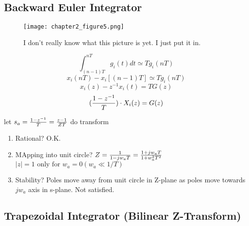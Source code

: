 \documentclass[11pt,fleqn]{book} %
\begin{document}
\subsection{Backward Euler Integrator}

\begin{figure}[h]
  \centering\texttt{[image: chapter2\_figure5.png]}
  \caption{I don't really know what this picture is yet. I just put it in.}
\end{figure}

$$\int_{(n-1)T}^{nT}g_i(t)dt\simeq Tg_i(nT)$$
$$x_i(nT)-x_i[(n-1)T]\simeq Tg_i(nT)$$
$$x_i(z)-z^{-1}x_i(t)=TG(z)$$
$$({1-z^{-1}\over T})\cdot X_i(z)=G(z)$$
\begin{tcolorbox}
  let $s_a={1-z^{-1}\over T}={z-1\over ZT}$ do transform
\end{tcolorbox}

\begin{enumerate}
  \item Rational? O.K.
  \item MApping into unit circle? $Z={1\over 1-jw_aT}={1+jw_aT\over 1+w_a^2T^2}$\\
  $|z|=1\text{ only for }w_a=0 (w_a\ll 1/T)$
  \item Stability? Poles move away from unit circle in Z-plane as poles move
  towards $jw_a$ axis in s-plane. Not satisfied.
\end{enumerate}

\subsection{Trapezoidal Integrator (Bilinear Z-Transform)}
\end{document}

